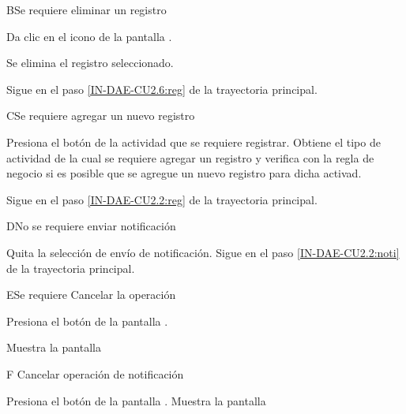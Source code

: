 \begin{UCtrayectoriaA}{B}{Se requiere eliminar un registro}
	
	\UCpaso [\UCactor] 	Da clic en el icono \IURechazar de la pantalla  .
	
	\UCpaso Se elimina el registro seleccionado.
	
	\UCpaso Sigue en el paso \ref{IN-DAE-CU2.6:reg}  de la trayectoria principal.
	
\end{UCtrayectoriaA}


\begin{UCtrayectoriaA}{C}{Se requiere agregar un nuevo registro }
	
	\UCpaso [\UCactor] Presiona el botón  de la actividad que se requiere registrar.
	\UCpaso Obtiene el tipo de actividad de la cual se requiere agregar un registro y verifica con la regla de negocio  si es posible que se agregue un nuevo registro para dicha activad.
	
	\UCpaso Sigue en el paso \ref{IN-DAE-CU2.2:reg}  de la trayectoria principal. 
	
\end{UCtrayectoriaA}


\begin{UCtrayectoriaA}{D}{No se requiere enviar notificación}
	
	\UCpaso [\UCactor] Quita la selección de envío de notificación.
	\UCpaso Sigue en el paso \ref{IN-DAE-CU2.2:noti}  de la trayectoria principal.
	
\end{UCtrayectoriaA}

%
\begin{UCtrayectoriaA}{E}{Se requiere Cancelar la operación}
	
	\UCpaso [\UCactor] 	Presiona el botón  de la pantalla .
	
	\UCpaso Muestra la pantalla  
	
\end{UCtrayectoriaA}


\begin{UCtrayectoriaA}{F}{ Cancelar operación de notificación}
	
	\UCpaso [\UCactor] Presiona el botón  de la pantalla .
	\UCpaso Muestra la pantalla  
	
\end{UCtrayectoriaA}

